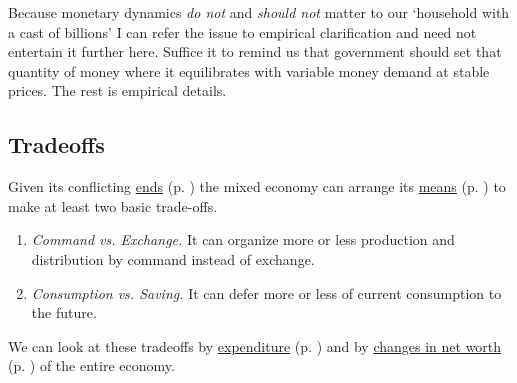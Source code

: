 Because monetary dynamics \emph{do not} and \emph{should not} matter to our `household with a cast of billions' I can refer the issue to empirical clarification and need not entertain it further here. Suffice it to remind us that government should set that quantity of money where it equilibrates with variable money demand at stable prices. The rest is empirical details.

\subsection[Tradeoffs]{Tradeoffs} \label{sec:tradeoffs} Given its conflicting \hyperref[sec:ends]{ends} (p. \pageref{sec:ends}) the mixed economy can arrange its \hyperref[sec:means]{means} (p. \pageref{sec:means}) to make at least two basic trade-offs. 
\begin{enumerate}
	\item \emph{Command vs. Exchange.} It can organize more or less production and distribution by command instead of exchange. 
	\item \emph{Consumption vs. Saving.} It can defer more or less of current consumption to the future. 
\end{enumerate}	
	
We can look at these tradeoffs by \hyperref[sec:byexpenditure]{expenditure} (p. \pageref{sec:byexpenditure}) and by \hyperref[sec:deltanetworth]{changes in net worth} (p. \pageref{sec:deltanetworth}) of the entire economy. 

